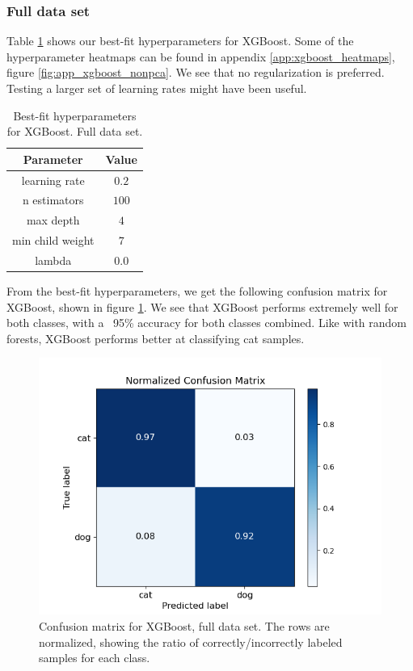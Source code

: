 \documentclass[a4paper]{article}
\begin{document}
\subsubsection{Full data set}
Table \ref{tab:best_fit_xgboost_nonpca} shows our best-fit hyperparameters for XGBoost. Some of the hyperparameter heatmaps can be found in appendix \ref{app:xgboost_heatmaps}, figure \ref{fig:app_xgboost_nonpca}. We see that no regularization is preferred. Testing a larger set of learning rates might have been useful.
\begin{table}[H]
  \centering
  \caption{Best-fit hyperparameters for XGBoost. Full data set.}
  \label{tab:best_fit_xgboost_nonpca}
  \begin{tabular}{c|c}
    \hline\hline
    Parameter & Value\\\hline
    learning rate  & $0.2$\\
    n estimators &  $100$\\
    max depth &  $4$\\
    min child weight & $7$ \\
    lambda & $0.0$
    \end{tabular}
\end{table}
From the best-fit hyperparameters, we get the following confusion matrix for XGBoost, shown in figure \ref{fig:xgboost_confusion_nonpca}. We see that XGBoost performs extremely well for both classes, with a ~95\% accuracy for both classes combined. Like with random forests, XGBoost performs better at classifying cat samples.
\begin{figure}[H]
	\centering
	\includegraphics[scale=0.7]{../figures/xgboost/confusion_matrix_nbins200_pca0_seed4155_ts0.20.png}
	\caption{Confusion matrix for XGBoost, full data set. The rows are normalized, showing the ratio of correctly/incorrectly labeled samples for each class.}
	\label{fig:xgboost_confusion_nonpca}
\end{figure}
\end{document}
